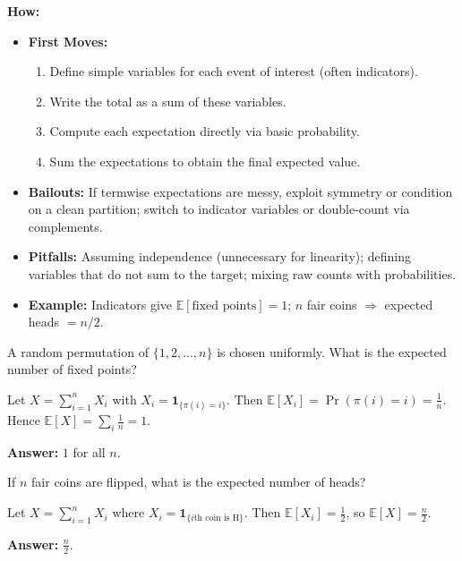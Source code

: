 \documentclass[12pt]{article}
\newenvironment{problem}[1]
{\begin{tcolorbox}[colback=blue!5!white,colframe=blue!75!black,title={#1}]}{\end{tcolorbox}}
\newenvironment{solution}
{\begin{tcolorbox}[colback=green!5!white,colframe=green!75!black,title={Solution}]}{\end{tcolorbox}}
\begin{document}
\textbf{How:}
\begin{itemize}
    \item \textbf{First Moves:}
    \begin{enumerate}[nosep]
        \item Define simple variables for each event of interest (often indicators).
        \item Write the total as a sum of these variables.
        \item Compute each expectation directly via basic probability.
        \item Sum the expectations to obtain the final expected value.
    \end{enumerate}
    \item \textbf{Bailouts:} If termwise expectations are messy, exploit symmetry or condition on a clean partition; switch to indicator variables or double-count via complements.
    \item \textbf{Pitfalls:} Assuming independence (unnecessary for linearity); defining variables that do not sum to the target; mixing raw counts with probabilities.
    \item \textbf{Example:} Indicators give $\mathbb{E}[\text{fixed points}]=1$; $n$ fair coins $\Rightarrow$ expected heads $=n/2$.
\end{itemize}

\begin{problem}{Example: Expected Number of Fixed Points}
A random permutation of $\{1,2,\dots,n\}$ is chosen uniformly. What is the expected number of fixed points?
\end{problem}

\begin{solution}
Let $X=\sum_{i=1}^n X_i$ with $X_i=\mathbf{1}_{\{\pi(i)=i\}}$. Then $\mathbb{E}[X_i]=\Pr(\pi(i)=i)=\tfrac{1}{n}$. Hence $\mathbb{E}[X]=\sum_i \tfrac{1}{n}=1$.

\textbf{Answer:} $1$ for all $n$.
\end{solution}

\begin{problem}{AMC 12 Style: Expected Heads}
If $n$ fair coins are flipped, what is the expected number of heads?
\end{problem}

\begin{solution}
Let $X=\sum_{i=1}^n X_i$ where $X_i=\mathbf{1}_{\{i\text{th coin is H}\}}$. Then $\mathbb{E}[X_i]=\tfrac12$, so $\mathbb{E}[X]=\tfrac{n}{2}$.

\textbf{Answer:} $\tfrac{n}{2}$.
\end{solution}
\end{document}
